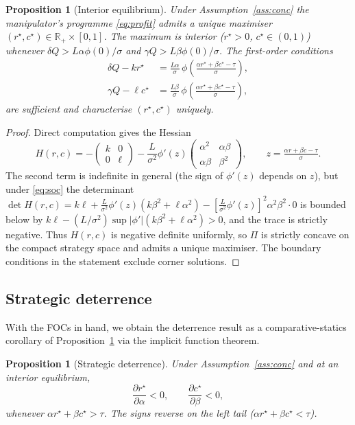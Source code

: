 \documentclass[11pt,a4paper]{article}
\newtheorem{proposition}[theorem]{Proposition}
\theoremstyle{definition}
\theoremstyle{remark}
\newcommand{\R}{\mathbb{R}}
\newcommand{\1}{\mathbf{1}}
\begin{document}
\begin{proposition}[Interior equilibrium]
\label{prop:eqexist}
Under Assumption~\ref{ass:conc} the manipulator's programme \eqref{eq:profit} admits a unique maximiser $(r^\star,c^\star)\in\R_+\times[0,1]$. The maximum is interior ($r^\star>0$, $c^\star\in(0,1)$) whenever $\delta Q>L\alpha\phi(0)/\sigma$ and $\gamma Q>L\beta\phi(0)/\sigma$. The first-order conditions
\begin{align}
\delta Q - k r^\star &= \frac{L\alpha}{\sigma}\,\phi\!\left(\frac{\alpha r^\star + \beta c^\star - \tau}{\sigma}\right),\label{eq:focr}\\
\gamma Q - \ell c^\star &= \frac{L\beta}{\sigma}\,\phi\!\left(\frac{\alpha r^\star + \beta c^\star - \tau}{\sigma}\right),\label{eq:focc}
\end{align}
are sufficient and characterise $(r^\star,c^\star)$ uniquely.
\end{proposition}

\begin{proof}
Direct computation gives the Hessian
\[
H(r,c)=-\begin{pmatrix}k & 0\\ 0 & \ell\end{pmatrix} - \frac{L}{\sigma^2}\phi'(z)\begin{pmatrix}\alpha^2 & \alpha\beta\\ \alpha\beta & \beta^2\end{pmatrix},\qquad z=\tfrac{\alpha r+\beta c-\tau}{\sigma}.
\]
The second term is indefinite in general (the sign of $\phi'(z)$ depends on $z$), but under \eqref{eq:soc} the determinant $\det H(r,c)=k\ell+\tfrac{L}{\sigma^2}\phi'(z)(k\beta^2+\ell\alpha^2)-[\tfrac{L}{\sigma^2}\phi'(z)]^2\alpha^2\beta^2\cdot 0$ is bounded below by $k\ell-(L/\sigma^2)\sup|\phi'|(k\beta^2+\ell\alpha^2)>0$, and the trace is strictly negative. Thus $H(r,c)$ is negative definite uniformly, so $\Pi$ is strictly concave on the compact strategy space and admits a unique maximiser. The boundary conditions in the statement exclude corner solutions.
\end{proof}

\subsection{Strategic deterrence}
With the FOCs in hand, we obtain the deterrence result as a comparative-statics corollary of Proposition~\ref{prop:eqexist} via the implicit function theorem.

\begin{proposition}[Strategic deterrence]
\label{prop:deter}
Under Assumption~\ref{ass:conc} and at an interior equilibrium,
\begin{equation}
\frac{\partial r^\star}{\partial\alpha}<0,\qquad \frac{\partial c^\star}{\partial\beta}<0,
\label{eq:deter}
\end{equation}
whenever $\alpha r^\star+\beta c^\star>\tau$. The signs reverse on the left tail ($\alpha r^\star+\beta c^\star<\tau$).
\end{proposition}
\end{document}
